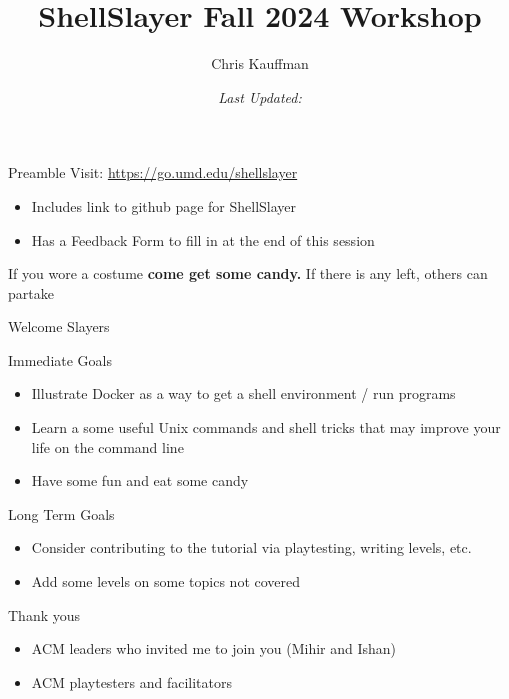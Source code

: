 \documentclass[mathserif]{beamer}
\author{Chris Kauffman}
\date{\it Last Updated: \newline }
\title{ShellSlayer Fall 2024 Workshop}
\begin{document}
\maketitle

\begin{frame}[label={sec:orgbc4536f}]{Preamble}
Visit: \url{https://go.umd.edu/shellslayer}
\begin{itemize}
\item Includes link to github page for ShellSlayer
\item Has a Feedback Form to fill in at the end of this session
\end{itemize}

If you wore a costume \textbf{come get some candy.}  If there is any left,
others can partake
\end{frame}

\begin{frame}[label={sec:org9ad0702}]{Welcome Slayers}
\begin{block}{Immediate Goals}
\begin{itemize}
\item Illustrate Docker as a way to get a shell environment / run programs
\item Learn a some useful Unix commands and shell tricks that may improve
your life on the command line
\item Have some fun and eat some candy
\end{itemize}
\end{block}

\begin{block}{Long Term Goals}
\begin{itemize}
\item Consider contributing to the tutorial via playtesting, writing
levels, etc.
\item Add some levels on some topics not covered
\end{itemize}
\end{block}

\begin{block}{Thank yous}
\begin{itemize}
\item ACM leaders who invited me to join you (Mihir and Ishan)
\item ACM playtesters and facilitators
\end{itemize}
\end{block}
\end{frame}
\end{document}
